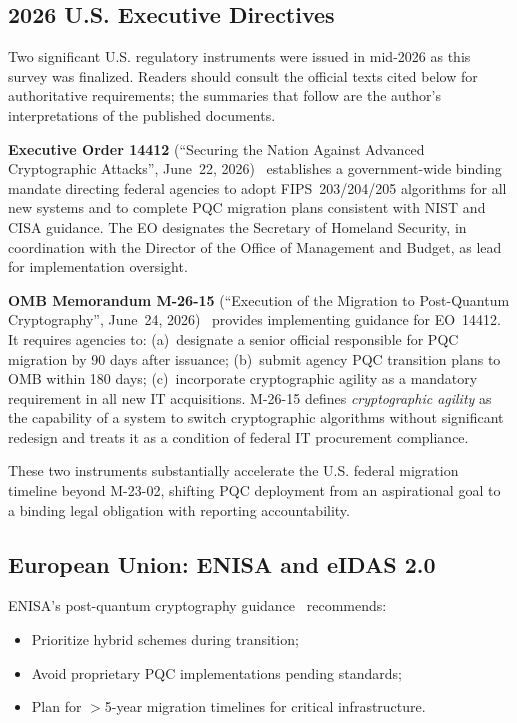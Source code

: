 \documentclass[journal]{IEEEtran}
\begin{document}
\subsection{2026 U.S. Executive Directives}

Two significant U.S. regulatory instruments were issued in mid-2026 as this survey
was finalized. Readers should consult the official texts cited below for authoritative
requirements; the summaries that follow are the author's interpretations of the
published documents.

\textbf{Executive Order 14412} (``Securing the Nation Against Advanced Cryptographic
Attacks'', June~22, 2026)~\cite{eo2026pqc} establishes a government-wide binding
mandate directing federal agencies to adopt FIPS~203/204/205 algorithms for all
new systems and to complete PQC migration plans consistent with NIST and CISA
guidance. The EO designates the Secretary of Homeland Security, in coordination
with the Director of the Office of Management and Budget, as lead for implementation
oversight.

\textbf{OMB Memorandum M-26-15} (``Execution of the Migration to Post-Quantum
Cryptography'', June~24, 2026)~\cite{omb2026m2615} provides implementing guidance
for EO~14412. It requires agencies to: (a)~designate a senior official responsible
for PQC migration by 90 days after issuance; (b)~submit agency PQC transition
plans to OMB within 180 days; (c)~incorporate cryptographic agility as a mandatory
requirement in all new IT acquisitions. M-26-15 defines \emph{cryptographic agility}
as the capability of a system to switch cryptographic algorithms without significant
redesign and treats it as a condition of federal IT procurement compliance.

These two instruments substantially accelerate the U.S. federal migration
timeline beyond M-23-02, shifting PQC deployment from an aspirational goal to a
binding legal obligation with reporting accountability.

\subsection{European Union: ENISA and eIDAS 2.0}

ENISA's post-quantum cryptography guidance~\cite{enisa2022pqc} recommends:
\begin{itemize}
  \item Prioritize hybrid schemes during transition;
  \item Avoid proprietary PQC implementations pending standards;
  \item Plan for $>$5-year migration timelines for critical infrastructure.
\end{itemize}
\end{document}
